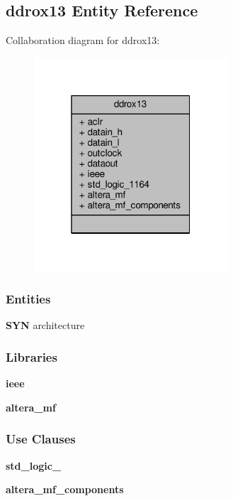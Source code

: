 \subsection{ddrox13 Entity Reference}
\label{classddrox13}


Collaboration diagram for ddrox13\+:\nopagebreak
\begin{figure}[H]
\begin{center}
\leavevmode
\includegraphics[width=205pt]{d2/d18/classddrox13__coll__graph}
\end{center}
\end{figure}
\subsubsection*{Entities}
\begin{DoxyCompactItemize}
\item 
{\bf S\+YN} architecture
\end{DoxyCompactItemize}
\subsubsection*{Libraries}
 \begin{DoxyCompactItemize}
\item 
{\bf ieee} 
\item 
{\bf altera\+\_\+mf} 
\end{DoxyCompactItemize}
\subsubsection*{Use Clauses}
 \begin{DoxyCompactItemize}
\item 
{\bf std\+\_\+logic\+\_}   
\item 
{\bf altera\+\_\+mf\+\_\+components}   
\end{DoxyCompactItemize}
